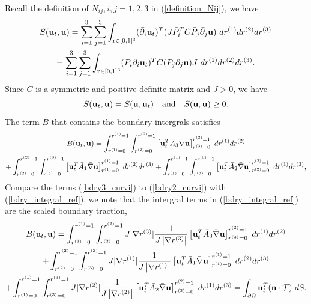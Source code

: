 \documentclass[a4paper]{article}
\begin{document}
Recall the definition of $N_{ij}, i,j = 1,2,3$ in (\ref{definition_Nij}), we have
\begin{multline*}
S({\bf u}_t,{\bf u}) = \sum_{i=1}^3\sum_{j=1}^3 \int_{{\bf r}\in[0,1]^3} (\bar{\partial}_i {\bf u}_t)^T(J\bar{P}_i^TC\bar{P}_j\bar{\partial}_j {\bf u})\ dr^{(1)}dr^{(2)}dr^{(3)} \\
= \sum_{i=1}^3\sum_{j=1}^3 \int_{{\bf r}\in[0,1]^3} (\bar{P}_i\bar{\partial}_i {\bf u}_t)^TC(\bar{P}_j\bar{\partial}_j {\bf u}) J\ dr^{(1)}dr^{(2)}dr^{(3)}.
\end{multline*}
Since $C$ is a symmetric and positive definite matrix and $J > 0$, we have 
\begin{equation*}
S({\bf u}_t,{\bf u}) = S({\bf u},{\bf u}_t) \ \ \  \text{and} \ \ \ S({\bf u},{\bf u}) \geq 0.
\end{equation*}
The term $B$ that contains the boundary intergrals satisfies
\begin{multline}\label{bdry_integral_ref}
B({\bf u}_t,{\bf u}) = \int_{r^{(1)} = 0}^{r^{(1)} = 1} \int_{r^{(2)} = 0}^{r^{(2)} = 1}  \left[{\bf u}_t^T\bar{A}_3\bar{\nabla} {\bf u}\right]_{r^{(3)}=0}^{r^{(3)}=1} \ dr^{(1)}dr^{(2)}\\
+ \int_{r^{(2)} = 0}^{r^{(2)} = 1} \int_{r^{(3)} = 0}^{r^{(3)} = 1}  \left[{\bf u}_t^T\bar{A}_1\bar{\nabla} {\bf u}\right]_{r^{(1)}=0}^{r^{(1)}=1}\ dr^{(2)}dr^{(3)} +\int_{r^{(1)} = 0}^{r^{(1)} = 1} \int_{r^{(3)} = 0}^{r^{(3)} = 1}  \left[{\bf u}_t^T\bar{A}_2\bar{\nabla} {\bf u}\right]_{r^{(2)}=0}^{r^{(2)}=1} \ dr^{(1)}dr^{(3)},
\end{multline}
Compare the terms (\ref{bdry3_curvi}) to (\ref{bdry2_curvi}) with (\ref{bdry_integral_ref}), we note that the intergral terms in (\ref{bdry_integral_ref}) are the scaled boundary traction,
\begin{multline}\label{bdry_integral_curvi}
B({\bf u}_t,{\bf u}) = \int_{r^{(1)} = 0}^{r^{(1)} = 1} \int_{r^{(2)} = 0}^{r^{(2)} = 1} J|\nabla r^{(3)}|\frac{1}{J\left|\nabla r^{(3)}\right|} \left[{\bf u}_t^T\bar{A}_3\bar{\nabla} {\bf u}\right]_{r^{(3)}=0}^{r^{(3)}=1} \ dr^{(1)}dr^{(2)}\\
+ \int_{r^{(2)} = 0}^{r^{(2)} = 1} \int_{r^{(3)} = 0}^{r^{(3)} = 1} J|\nabla r^{(1)}|\frac{1}{J\left|\nabla r^{(1)}\right|}  \left[{\bf u}_t^T\bar{A}_1\bar{\nabla} {\bf u}\right]_{r^{(1)}=0}^{r^{(1)}=1}\ dr^{(2)}dr^{(3)} \\
+\int_{r^{(1)} = 0}^{r^{(1)} = 1} \int_{r^{(3)} = 0}^{r^{(3)} = 1} J|\nabla r^{(2)}|\frac{1}{J\left|\nabla r^{(2)}\right|}  \left[{\bf u}_t^T\bar{A}_2\bar{\nabla} {\bf u}\right]_{r^{(2)}=0}^{r^{(2)}=1} \ dr^{(1)}dr^{(3)} = \int_{\partial \Omega} {\bf u}_t^T({\bf n}\cdot\mathcal{T})\ dS.
\end{multline}
\end{document}
